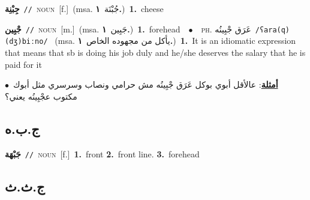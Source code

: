 \documentclass[10pt,a4paper,twoside]{article} %
\begin{document}
\begin{multicols}{2}
{{{{{\setlength\topsep{0pt}\textbf{\foreignlanguage{arabic}{جِبْنِة}}\ {\color{gray}\texttt{//}\color{black}}\ \textsc{noun}\ [f.]\ \color{gray}(msa. \foreignlanguage{arabic}{جُبْنَة}~\foreignlanguage{arabic}{\textbf{١.}})\color{black}\ \textbf{1.}~cheese\ 

{\setlength\topsep{0pt}\textbf{\foreignlanguage{arabic}{جْبِين}}\ {\color{gray}\texttt{//}\color{black}}\ \textsc{noun}\ [m.]\ \color{gray}(msa. \foreignlanguage{arabic}{جَبِين}~\foreignlanguage{arabic}{\textbf{١.}})\color{black}\ \textbf{1.}~forehead\ \ $\bullet$\ \ \textsc{ph.} \color{gray} \foreignlanguage{arabic}{عَرَق جْبِينُه}\color{black}\ {\color{gray}\texttt{/{\sffamily ʕara(q) (dʒ)biːno}/}\color{black}}\ \color{gray} (msa. \foreignlanguage{arabic}{يأكل من مجهوده الخاص}~\foreignlanguage{arabic}{\textbf{١.}})\color{black}\ \textbf{1.}~It is an idiomatic expression that means that sb is doing his job duly and he/she deserves the salary that he is paid for it\  \begin{flushright}\color{gray}\foreignlanguage{arabic}{\textbf{\underline{\foreignlanguage{arabic}{أمثلة}}}: عالأقل أبوي بوكل عَرَق جْبِينُه مش حرامي ونصاب وسرسري مثل أبوك\ $\bullet$\ \  مكتوب عجْبِينُه يعني؟}\end{flushright}\color{black}} \vspace{2mm}

\vspace{-3mm}
\subsection*{\color{blue}\foreignlanguage{arabic}{ج.ب.ه}\color{blue}{}} 

{\setlength\topsep{0pt}\textbf{\foreignlanguage{arabic}{جَبْهَة}}\ {\color{gray}\texttt{//}\color{black}}\ \textsc{noun}\ [f.]\ \textbf{1.}~front  \textbf{2.}~front line.  \textbf{3.}~forehead\ 

\vspace{-3mm}
\subsection*{\color{blue}\foreignlanguage{arabic}{ج.ث.ث}\color{blue}{}} 

}}}}}}
\end{multicols}
\end{document}
